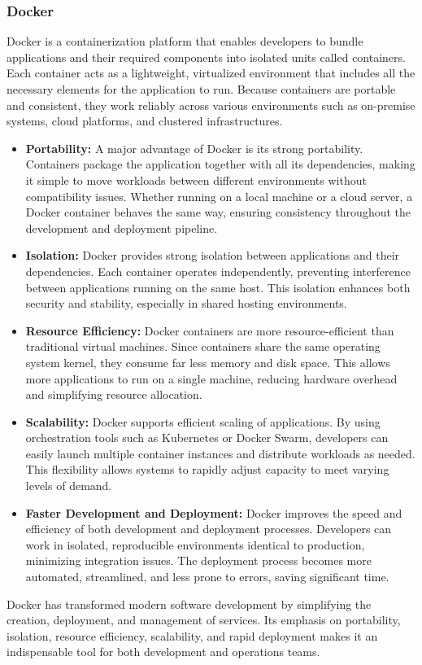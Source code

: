 \subsubsection*{Docker}
Docker is a containerization platform that enables developers to bundle applications and their required components into isolated units called {containers}. Each container acts as a lightweight, virtualized environment that includes all the necessary elements for the application to run. Because containers are portable and consistent, they work reliably across various environments such as on-premise systems, cloud platforms, and clustered infrastructures.
\begin{itemize}
    \item \textbf{Portability:} A major advantage of Docker is its strong portability. Containers package the application together with all its dependencies, making it simple to move workloads between different environments without compatibility issues. Whether running on a local machine or a cloud server, a Docker container behaves the same way, ensuring consistency throughout the development and deployment pipeline.

    \item \textbf{Isolation:} Docker provides strong isolation between applications and their dependencies. Each container operates independently, preventing interference between applications running on the same host. This isolation enhances both security and stability, especially in shared hosting environments.

    \item \textbf{Resource Efficiency:} Docker containers are more resource-efficient than traditional virtual machines. Since containers share the same operating system kernel, they consume far less memory and disk space. This allows more applications to run on a single machine, reducing hardware overhead and simplifying resource allocation.

    \item \textbf{Scalability:} Docker supports efficient scaling of applications. By using orchestration tools such as Kubernetes or Docker Swarm, developers can easily launch multiple container instances and distribute workloads as needed. This flexibility allows systems to rapidly adjust capacity to meet varying levels of demand.

    \item \textbf{Faster Development and Deployment:} Docker improves the speed and efficiency of both development and deployment processes. Developers can work in isolated, reproducible environments identical to production, minimizing integration issues. The deployment process becomes more automated, streamlined, and less prone to errors, saving significant time.
\end{itemize}
Docker has transformed modern software development by simplifying the creation, deployment, and management of services. Its emphasis on portability, isolation, resource efficiency, scalability, and rapid deployment makes it an indispensable tool for both development and operations teams.
